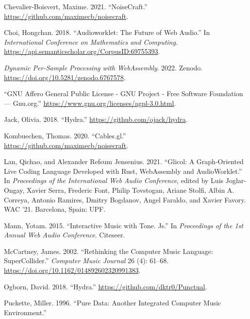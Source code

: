 \documentclass[11pt,]{article}
\newlength{\cslhangindent}
\newenvironment{CSLReferences}[2] %
 {\begin{list}{}{%
  \setlength{\itemindent}{0pt}
  \setlength{\leftmargin}{0pt}
  \setlength{\parsep}{0pt}
  \ifodd #1
   \setlength{\leftmargin}{\cslhangindent}
   \setlength{\itemindent}{-1\cslhangindent}
  \fi
  \setlength{\itemsep}{#2\baselineskip}}}
 {\end{list}}
\begin{document}
\label{refs}
\begin{CSLReferences}{1}{0}
Chevalier-Boisvert, Maxime. 2021. {``NoiseCraft.''}
\url{https://github.com/maximecb/noisecraft}.

Choi, Hongchan. 2018. {``Audioworklet: The Future of Web Audio.''} In
\emph{International Conference on Mathematics and Computing}.
\url{https://api.semanticscholar.org/CorpusID:69755393}.

\emph{Dynamic Per-Sample Processing with WebAssembly}. 2022. Zenodo.
\url{https://doi.org/10.5281/zenodo.6767578}.

{``{G}{N}{U} {A}ffero {G}eneral {P}ublic {L}icense - {G}{N}{U} {P}roject
- {F}ree {S}oftware {F}oundation --- Gnu.org.''}
\url{https://www.gnu.org/licenses/agpl-3.0.html}.

Jack, Olivia. 2018. {``Hydra.''} \url{https://github.com/ojack/hydra}.

Kombuechen, Thomas. 2020. {``Cables.gl.''}
\url{https://github.com/maximecb/noisecraft}.

Lan, Qichao, and Alexander Refsum Jensenius. 2021. {``Glicol: A
Graph-Oriented Live Coding Language Developed with Rust, WebAssembly and
AudioWorklet.''} In \emph{Proceedings of the International Web Audio
Conference}, edited by Luis Joglar-Ongay, Xavier Serra, Frederic Font,
Philip Tovstogan, Ariane Stolfi, Albin A. Correya, Antonio Ramires,
Dmitry Bogdanov, Angel Faraldo, and Xavier Favory. WAC '21. Barcelona,
Spain: UPF.

Mann, Yotam. 2015. {``Interactive Music with Tone. Js.''} In
\emph{Proceedings of the 1st Annual Web Audio Conference}. Citeseer.

McCartney, James. 2002. {``{Rethinking the Computer Music Language:
SuperCollider}.''} \emph{Computer Music Journal} 26 (4): 61--68.
\url{https://doi.org/10.1162/014892602320991383}.

Ogborn, David. 2018. {``Hydra.''}
\url{https://github.com/dktr0/Punctual}.

Puckette, Miller. 1996. {``Pure Data: Another Integrated Computer Music
Environment.''}


\end{CSLReferences}
\end{document}
